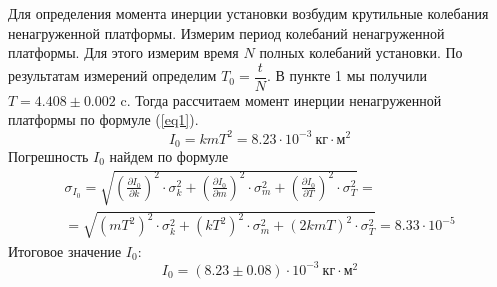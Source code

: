 \documentclass[a4paper,12pt]{article}
\begin{document}
\begin{enumerate}
	Для определения момента инерции установки возбудим крутильные колебания ненагруженной платформы. Измерим период колебаний ненагруженной платформы. Для этого измерим время $N$ полных колебаний установки. По результатам измерений определим $ T_{0} = \dfrac{t}{N}$. В пункте 1 мы получили $T = 4.408 \pm 0.002$ c. Тогда рассчитаем момент инерции ненагруженной платформы по формуле (\ref{eq1}).
	$$
	I_0 = kmT^2 = 8.23\cdot 10^{-3}~\text{кг$\cdot$м$^2$}
	$$
	Погрешность $I_0$ найдем по формуле
	\begin{multline*}
	\sigma_{I_0} = \sqrt{\left(\frac{\partial{I_0}}{\partial{k}}\right)^2\cdot\sigma_k^2 + \left(\frac{\partial{I_0}}{\partial{m}}\right)^2\cdot \sigma_m^2 + \left(\frac{\partial{I_0}}{\partial{T}}\right)^2\cdot \sigma_T^2} =  \\
		= \sqrt{\left(mT^2\right)^2\cdot \sigma_k^2 + \left(kT^2\right)^2\cdot \sigma_m^2 +  \left(2kmT\right)^2\cdot \sigma_T^2} = 8.33\cdot 10^{-5}
	\end{multline*}
	Итоговое значение $I_0$:
	$$
	I_0 = (8.23\pm 0.08)\cdot 10^{-3}~\text{кг$\cdot$м$^2$}
	$$


\end{enumerate}
\end{document}
